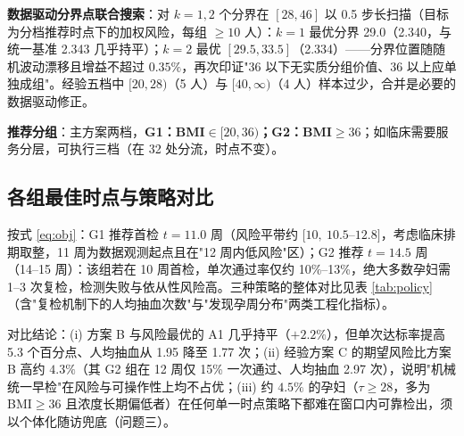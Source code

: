 \documentclass[11pt,a4paper]{ctexart}
\begin{document}
\textbf{数据驱动分界点联合搜索}：对 $k=1,2$ 个分界在 $[28,46]$ 以 0.5 步长扫描（目标为分档推荐时点下的加权风险，每组 $\ge10$ 人）：$k=1$ 最优分界 29.0（2.340，与统一基准 2.343 几乎持平）；$k=2$ 最优 $[29.5,33.5]$（2.334）——分界位置随随机波动漂移且增益不超过 $0.35\%$，再次印证"36 以下无实质分组价值、36 以上应单独成组"。经验五档中 $[20,28)$（5 人）与 $[40,\infty)$（4 人）样本过少，合并是必要的数据驱动修正。

\textbf{推荐分组}：主方案两档，\textbf{G1：BMI$\in[20,36)$；G2：BMI$\ge36$}；如临床需要服务分层，可执行三档（在 32 处分流，时点不变）。

\subsection{各组最佳时点与策略对比}
按式 \eqref{eq:obj}：G1 推荐首检 $t=11.0$ 周（风险平带约 $[10,\ 10.5$--$12.8]$，考虑临床排期取整，11 周为数据观测起点且在"12 周内低风险"区）；G2 推荐 $t=14.5$ 周（14--15 周）：该组若在 10 周首检，单次通过率仅约 10\%--13\%，绝大多数孕妇需 1--3 次复检，检测失败与依从性风险高。三种策略的整体对比见表 \ref{tab:policy}（含"复检机制下的人均抽血次数"与"发现孕周分布"两类工程化指标）。

\begin{table}[H]
\centering\small
\caption{三种策略对比（BLUP 估计 $\tau$，全体 267 名孕妇）}\label{tab:policy}
\end{table}

对比结论：(i) 方案 B 与风险最优的 A1 几乎持平（$+2.2\%$），但单次达标率提高 5.3 个百分点、人均抽血从 1.95 降至 1.77 次；(ii) 经验方案 C 的期望风险比方案 B 高约 $4.3\%$（其 G2 组在 12 周仅 15\% 一次通过、人均抽血 2.97 次），说明"机械统一早检"在风险与可操作性上均不占优；(iii) 约 $4.5\%$ 的孕妇（$\tau\ge28$，多为 BMI$\ge36$ 且浓度长期偏低者）在任何单一时点策略下都难在窗口内可靠检出，须以个体化随访兜底（问题三）。
\end{document}
